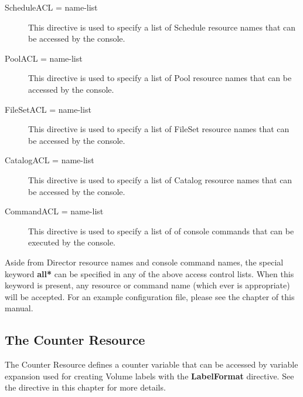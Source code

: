\begin{description}
\item [ScheduleACL = \lt{}name-list\gt{}]
   This directive is used to  specify a list of Schedule resource names that can
be accessed by  the console.  

\item [PoolACL = \lt{}name-list\gt{}]
   This directive is used to  specify a list of Pool resource names that can be
accessed by  the console.  

\item [FileSetACL = \lt{}name-list\gt{}]
   This directive is used to  specify a list of FileSet resource names that can
be accessed by  the console.  

\item [CatalogACL = \lt{}name-list\gt{}]
   This directive is used to  specify a list of Catalog resource names that can
be accessed by  the console.  

\item [CommandACL = \lt{}name-list\gt{}]
   This directive is used to  specify a list of of console commands that can be
executed by  the console. 
\end{description}

Aside from Director resource names and console command names, the special
keyword {\bf *all*} can be specified in any of the above access control lists.
When this keyword is present, any resource or command name (which ever is
appropriate) will be accepted. For an example configuration file, please see
the 
 chapter of this
manual. 

\subsection*{The Counter Resource}
\label{CounterResource}

The Counter Resource defines a counter variable that can be accessed by
variable expansion used for creating Volume labels with the {\bf LabelFormat}
directive. See the 
 directive in this chapter for more
details. 

